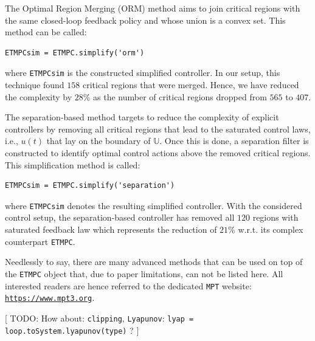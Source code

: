 \documentclass[letterpaper, 10 pt, conference]{ieeeconf}
\begin{document}
The Optimal Region Merging (ORM) method aims to join critical regions with the same closed-loop feedback policy and whose union is a convex set. This method can be called: 
\begin{lstlisting}[style=Matlab-editor]
ETMPCsim = ETMPC.simplify('orm')
\end{lstlisting}
where \verb|ETMPCsim| is the constructed simplified controller. In our setup, this technique found $158$ critical regions that were merged. Hence, we have reduced the complexity by $28\%$ as the number of critical regions dropped from $565$ to $407$. 

%
%
The separation-based method targets to reduce the complexity of explicit controllers by removing all critical regions that lead to the saturated control laws, i.e., $u(t)$ that lay on the boundary of $\mathbb{U}$. Once this is done, a separation filter is constructed to identify optimal control actions above the removed critical regions. This simplification method is called:
\begin{lstlisting}[style=Matlab-editor]
ETMPCsim = ETMPC.simplify('separation')
\end{lstlisting}
where \verb|ETMPCsim| denotes the resulting simplified controller. With the considered control setup, the separation-based controller has removed all $120$ regions with saturated feedback law which represents the reduction of $21\%$ w.r.t. its complex counterpart \verb|ETMPC|.

Needlessly to say, there are many advanced methods that can be used on top of the \verb|ETMPC| object that, due to paper limitations, can not be listed here. All interested readers are hence referred to the dedicated \texttt{MPT} website: \\ \texttt{\url{https://www.mpt3.org}}.

[ TODO: How about: \texttt{clipping}, \texttt{Lyapunov}: \texttt{lyap = loop.toSystem.lyapunov(type)} ? ]
\end{document}

